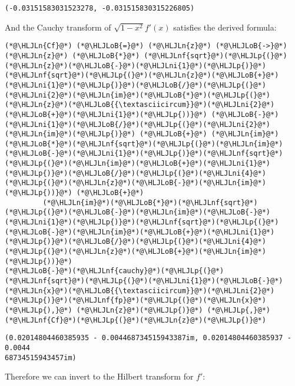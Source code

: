 \documentclass[12pt,a4paper]{article}
\newcommand{\HLJLn}[1]{#1}
\newcommand{\HLJLnf}[1]{\textcolor[RGB]{66,102,213}{#1}}
\newcommand{\HLJLni}[1]{\textcolor[RGB]{59,151,46}{#1}}
\newcommand{\HLJLoB}[1]{\textcolor[RGB]{102,102,102}{\textbf{#1}}}
\newcommand{\HLJLp}[1]{#1}
\begin{document}
\begin{lstlisting}
(-0.03151583031523278, -0.031515830315226805)
\end{lstlisting}


And the Cauchy transform of $\sqrt{1-x^2} f'(x)$ satisfies the derived formula:


\begin{lstlisting}
(*@\HLJLn{Cf}@*) (*@\HLJLoB{=}@*) (*@\HLJLn{z}@*) (*@\HLJLoB{->}@*) (*@\HLJLn{z}@*) (*@\HLJLoB{*}@*) (*@\HLJLnf{sqrt}@*)(*@\HLJLp{(}@*)(*@\HLJLn{z}@*)(*@\HLJLoB{-}@*)(*@\HLJLni{1}@*)(*@\HLJLp{)}@*)(*@\HLJLnf{sqrt}@*)(*@\HLJLp{(}@*)(*@\HLJLn{z}@*)(*@\HLJLoB{+}@*)(*@\HLJLni{1}@*)(*@\HLJLp{)}@*)(*@\HLJLoB{/}@*)(*@\HLJLp{(}@*)(*@\HLJLni{2}@*)(*@\HLJLn{im}@*)(*@\HLJLoB{*}@*)(*@\HLJLp{(}@*)(*@\HLJLn{z}@*)(*@\HLJLoB{{\textasciicircum}}@*)(*@\HLJLni{2}@*)(*@\HLJLoB{+}@*)(*@\HLJLni{1}@*)(*@\HLJLp{))}@*) (*@\HLJLoB{-}@*) (*@\HLJLni{1}@*)(*@\HLJLoB{/}@*)(*@\HLJLp{(}@*)(*@\HLJLni{2}@*)(*@\HLJLn{im}@*)(*@\HLJLp{)}@*) (*@\HLJLoB{+}@*) (*@\HLJLn{im}@*)(*@\HLJLoB{*}@*)(*@\HLJLnf{sqrt}@*)(*@\HLJLp{(}@*)(*@\HLJLn{im}@*)(*@\HLJLoB{-}@*)(*@\HLJLni{1}@*)(*@\HLJLp{)}@*)(*@\HLJLnf{sqrt}@*)(*@\HLJLp{(}@*)(*@\HLJLn{im}@*)(*@\HLJLoB{+}@*)(*@\HLJLni{1}@*)(*@\HLJLp{)}@*)(*@\HLJLoB{/}@*)(*@\HLJLp{(}@*)(*@\HLJLni{4}@*)(*@\HLJLp{(}@*)(*@\HLJLn{z}@*)(*@\HLJLoB{-}@*)(*@\HLJLn{im}@*)(*@\HLJLp{))}@*) (*@\HLJLoB{+}@*)
         (*@\HLJLn{im}@*)(*@\HLJLoB{*}@*)(*@\HLJLnf{sqrt}@*)(*@\HLJLp{(}@*)(*@\HLJLoB{-}@*)(*@\HLJLn{im}@*)(*@\HLJLoB{-}@*)(*@\HLJLni{1}@*)(*@\HLJLp{)}@*)(*@\HLJLnf{sqrt}@*)(*@\HLJLp{(}@*)(*@\HLJLoB{-}@*)(*@\HLJLn{im}@*)(*@\HLJLoB{+}@*)(*@\HLJLni{1}@*)(*@\HLJLp{)}@*)(*@\HLJLoB{/}@*)(*@\HLJLp{(}@*)(*@\HLJLni{4}@*)(*@\HLJLp{(}@*)(*@\HLJLn{z}@*)(*@\HLJLoB{+}@*)(*@\HLJLn{im}@*)(*@\HLJLp{))}@*)
(*@\HLJLoB{-}@*)(*@\HLJLnf{cauchy}@*)(*@\HLJLp{(}@*)(*@\HLJLnf{sqrt}@*)(*@\HLJLp{(}@*)(*@\HLJLni{1}@*)(*@\HLJLoB{-}@*)(*@\HLJLn{x}@*)(*@\HLJLoB{{\textasciicircum}}@*)(*@\HLJLni{2}@*)(*@\HLJLp{)}@*)(*@\HLJLnf{fp}@*)(*@\HLJLp{(}@*)(*@\HLJLn{x}@*)(*@\HLJLp{),}@*) (*@\HLJLn{z}@*)(*@\HLJLp{)}@*) (*@\HLJLp{,}@*) (*@\HLJLnf{Cf}@*)(*@\HLJLp{(}@*)(*@\HLJLn{z}@*)(*@\HLJLp{)}@*)
\end{lstlisting}

\begin{lstlisting}
(0.02014804460385935 - 0.004468734515943387im, 0.02014804460385937 - 0.0044
68734515943457im)
\end{lstlisting}


Therefore we can invert to the Hilbert transform for $f'$:
\end{document}
